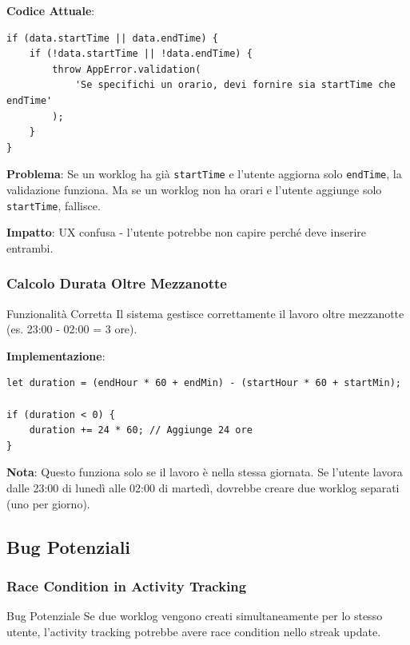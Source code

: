 \documentclass[11pt,a4paper]{article}
\begin{document}
\textbf{Codice Attuale}:
\begin{lstlisting}
if (data.startTime || data.endTime) {
    if (!data.startTime || !data.endTime) {
        throw AppError.validation(
            'Se specifichi un orario, devi fornire sia startTime che endTime'
        );
    }
}
\end{lstlisting}

\textbf{Problema}: Se un worklog ha già \texttt{startTime} e l'utente aggiorna solo \texttt{endTime}, la validazione funziona. Ma se un worklog non ha orari e l'utente aggiunge solo \texttt{startTime}, fallisce.

\textbf{Impatto}: UX confusa - l'utente potrebbe non capire perché deve inserire entrambi.

\subsubsection{Calcolo Durata Oltre Mezzanotte}

\begin{tipbox}{Funzionalità Corretta}
Il sistema gestisce correttamente il lavoro oltre mezzanotte (es. 23:00 - 02:00 = 3 ore).
\end{tipbox}

\textbf{Implementazione}:
\begin{lstlisting}
let duration = (endHour * 60 + endMin) - (startHour * 60 + startMin);

if (duration < 0) {
    duration += 24 * 60; // Aggiunge 24 ore
}
\end{lstlisting}

\textbf{Nota}: Questo funziona solo se il lavoro è nella stessa giornata. Se l'utente lavora dalle 23:00 di lunedì alle 02:00 di martedì, dovrebbe creare due worklog separati (uno per giorno).

\subsection{Bug Potenziali}

\subsubsection{Race Condition in Activity Tracking}

\begin{warningbox}{Bug Potenziale}
Se due worklog vengono creati simultaneamente per lo stesso utente, l'activity tracking potrebbe avere race condition nello streak update.
\end{warningbox}
\end{document}
